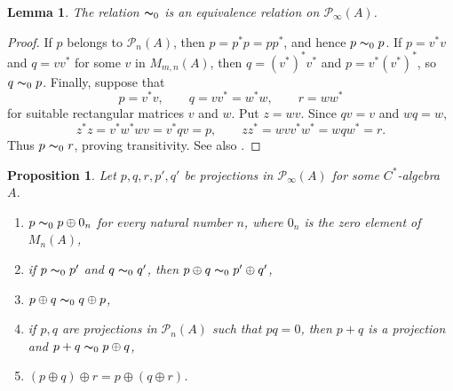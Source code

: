 \documentclass{book}
\newtheorem{lemma}[definition]{Lemma}
\newtheorem{proposition}[definition]{Proposition}
\def\cstar{\(C^*\)-algebra}
\begin{document}
\begin{lemma}
  The relation \(\thicksim_0\) is an equivalence relation on \(\mathcal{P}_\infty(A)\).
\end{lemma}
\begin{proof}
  If \(p\) belongs to \(\mathcal{P}_n(A)\), then \(p=p^*p=pp^*\), and hence \(p\thicksim_0p\).
  If \(p=v^*v\) and \(q=vv^*\) for some \(v\) in \(M_{m,n}(A)\), then
  \(q={(v^*)}^*v^*\) and \(p=v^*{(v^*)}^*\), so \(q\thicksim_0p\).
  Finally, suppose that
  \[
    p=v^*v,\qquad q=vv^*=w^*w,\qquad r=ww^*
  \]
  for suitable rectangular matrices \(v\) and \(w\). Put \(z=wv\). Since \(qv=v\) and \(wq=w\),
  \[
    z^*z=v^*w^*wv=v^*qv=p,
    \qquad
    zz^*=wvv^*w^*=wqw^*=r.
  \]
  Thus \(p\thicksim_0r\), proving transitivity. See also
  \cite[Section~2.3]{RordamLarsenLaustsen2000}.
\end{proof}
\begin{proposition}\label{prop:232}
  Let \(p,q,r,p',q'\) be projections in \(\mathcal{P}_\infty(A)\) for some \cstar\ \(A\).
  \begin{enumerate}
    \item \(p\thicksim_0 p\oplus 0_n\) for every natural number \(n\), where \(0_n\) is the zero element of \(M_n(A)\),
    \item if \(p\thicksim_0 p'\) and \(q\thicksim_0 q'\), then \(p\oplus q\thicksim_0 p'\oplus q'\),
    \item \(p\oplus q\thicksim_0 q\oplus p\),
    \item if \(p, q\) are projections in \(\mathcal{P}_n(A)\) such that \(pq=0\), then \(p+q\) is a projection and \(p+q\thicksim_0 p\oplus q\),
    \item \((p\oplus q)\oplus r=p\oplus(q\oplus r)\).
  \end{enumerate}
\end{proposition}
\end{document}
